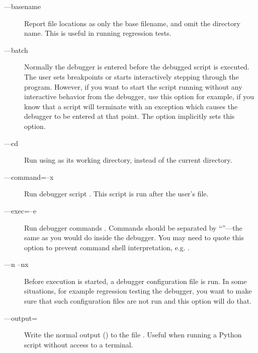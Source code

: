 \begin{description} 

\item[--{}--basename]

Report file locations as only the base filename, and omit the
directory name. This is useful in running regression tests.

\item[--{}--batch]

Normally the debugger is entered before the debugged script is
executed. The user sets breakpoints or starts interactively stepping
through the program. However, if you want to start the script running
without any interactive behavior from the debugger, use this option
for example, if you know that a script will terminate with an
exception which causes the debugger to be entered at that point. The
 option implicitly sets this option.

\item[--{}--cd ]

Run  using  as its working directory,
instead of the current directory.

\item[--{}--command=\code{\Large{|}}--x ]\label{switch:command}

Run debugger script . This script is run after
the user's  file.

\item[--{}--exec=\code{\Large{|}}--e ]\label{exec:command}

Run debugger commands . Commands should be separated
by ``\code{;;}''---the same as you would do inside the debugger. You may
need to quote this option to prevent command shell
interpretation, e.g. .

\item[--{}--n\code{\Large{|}} --nx]\label{switch:nx}

Before execution is started, a debugger configuration file
 is run. In some situations, for example regression
testing the debugger, you want to make sure that such configuration
files are not run and this option will do that.

\item[--{}--output=]

Write the normal output () to the file
. Useful when running a Python script without access to
a terminal.


\end{description}
